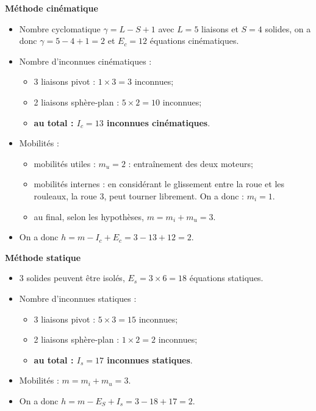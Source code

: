 \documentclass[10pt,fleqn]{article} %
\begin{document}
\begin{multicols}{2}
\textbf{Méthode cinématique}
\begin{itemize}
\item Nombre cyclomatique $\gamma = L-S+1 $ avec $L=5$ liaisons et $S=4$ solides, on a donc $\gamma = 5-4+1=2$ et $E_c=12$ équations cinématiques.
\item Nombre d'inconnues cinématiques : 
\begin{itemize}
\item 3 liaisons pivot : $1\times 3=3$ inconnues;
\item 2 liaisons sphère-plan : $5\times 2=10$ inconnues;
\item \textbf{au total : $I_c=13$ inconnues cinématiques}.
\end{itemize}
\item Mobilités : 
\begin{itemize}
\item mobilités utiles : $m_u=2$ : entraînement des deux moteurs;
\item mobilités internes : en considérant le glissement entre la roue et les rouleaux, la roue 3, peut tourner librement. On a donc : $m_i =1$. %
\item au final, selon les hypothèses, $m=m_i+m_u=3$.
\end{itemize}
\item On a donc $h=m-I_c+E_c =3-13+12=2$.
\end{itemize}

\vfill\null
\columnbreak

\textbf{Méthode statique}
\begin{itemize}
\item 3 solides peuvent être isolés, $E_s=3\times 6 =18$ équations statiques.
\item Nombre d'inconnues statiques : 
\begin{itemize}
\item 3 liaisons pivot : $5\times 3=15$ inconnues;
\item 2 liaisons sphère-plan : $1\times 2=2$ inconnues;
\item \textbf{au total : $I_s=17$ inconnues statiques}.
\end{itemize}
\item Mobilités : $m=m_i+m_u=3$.
\item On a donc $h=m-E_S+I_s =3-18+17=2$.
\end{itemize}
\end{multicols}
\end{document}

